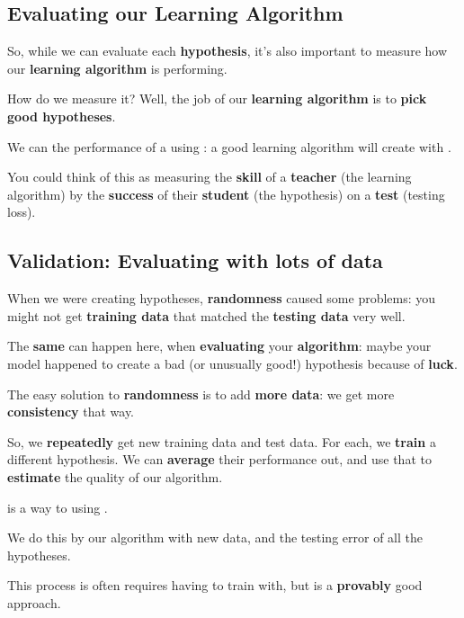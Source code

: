    \subsection*{Evaluating our Learning Algorithm}
    
        So, while we can evaluate each \textbf{hypothesis}, it's also important to measure how our \textbf{learning algorithm} is performing.
        
        How do we measure it? Well, the job of our \textbf{learning algorithm} is to \textbf{pick good hypotheses}.\\
        
        \begin{concept}
            We can  the performance of a  using : a good learning algorithm will create  with .
        \end{concept}
        
        You could think of this as measuring the \textbf{skill} of a \textbf{teacher} (the learning algorithm) by the \textbf{success} of their \textbf{student} (the hypothesis) on a \textbf{test} (testing loss).
        
    \subsection*{Validation: Evaluating with lots of data}
    
        When we were creating hypotheses, \textbf{randomness} caused some problems: you might not get \textbf{training data} that matched the \textbf{testing data} very well.
        
        The \textbf{same} can happen here, when \textbf{evaluating} your \textbf{algorithm}: maybe your model happened to create a bad (or unusually good!) hypothesis because of \textbf{luck}.
        
        The easy solution to \textbf{randomness} is to add \textbf{more data}: we get more \textbf{consistency} that way.
        
        So, we \textbf{repeatedly} get new training data and test data. For each, we \textbf{train} a different hypothesis. We can \textbf{average} their performance out, and use that to \textbf{estimate} the quality of our algorithm.\\
        
        \begin{definition}
             is a way to  using .
            
            We do this by  our algorithm  with new data, and  the testing error of all the hypotheses.
            
            This process is often requires having  to train with, but is a \textbf{provably} good approach.
        \end{definition}
        
